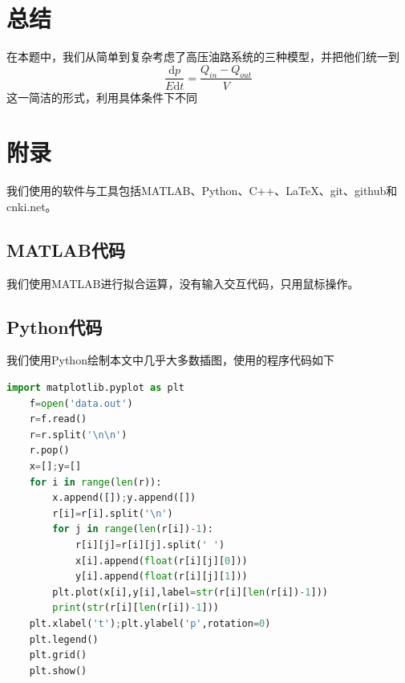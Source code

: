 \documentclass[12pt,AutoFakeBold]{article}%
\newcommand{\dif}{\mathrm{d}}
\begin{document}
    \section{总结}
    在本题中，我们从简单到复杂考虑了高压油路系统的三种模型，并把他们统一到
    \[\frac{\dif p}{E\dif t}=\frac{Q_{in}-Q_{out}}{V}\]
    这一简洁的形式，利用具体条件下不同

    \newpage
    \pagestyle{empty}
    \section{附录}
    我们使用的软件与工具包括MATLAB、Python、C++、\LaTeX、git、github和cnki.net。
    \subsection{MATLAB代码}
    我们使用MATLAB进行拟合运算，没有输入交互代码，只用鼠标操作。
    \subsection{Python代码}
    我们使用Python绘制本文中几乎大多数插图，使用的程序代码如下
    \begin{lstlisting}[language={python}]
    import matplotlib.pyplot as plt
    f=open('data.out')
    r=f.read()
    r=r.split('\n\n')
    r.pop()
    x=[];y=[]
    for i in range(len(r)):
        x.append([]);y.append([])
        r[i]=r[i].split('\n')
        for j in range(len(r[i])-1):
            r[i][j]=r[i][j].split(' ')
            x[i].append(float(r[i][j][0]))
            y[i].append(float(r[i][j][1]))
        plt.plot(x[i],y[i],label=str(r[i][len(r[i])-1]))
        print(str(r[i][len(r[i])-1]))
    plt.xlabel('t');plt.ylabel('p',rotation=0)
    plt.legend()
    plt.grid()
    plt.show()
    \end{lstlisting}
\end{document}
